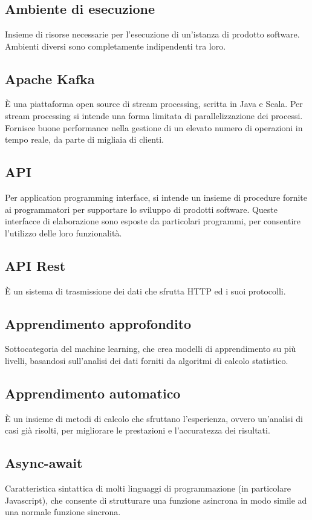   \section[A]{}
	\subsection*{Ambiente di esecuzione}
	Insieme di risorse necessarie per l'esecuzione di un'istanza di prodotto software. Ambienti diversi sono completamente indipendenti tra loro.
	\subsection*{Apache Kafka}
	È una piattaforma open source di stream processing, scritta in Java e Scala. Per stream processing si intende una forma limitata di parallelizzazione dei processi. Fornisce buone performance nella gestione di un elevato numero di operazioni in tempo reale, da parte di migliaia di clienti.
	\subsection*{API}
	Per application programming interface, si intende un insieme di procedure fornite ai programmatori per supportare lo sviluppo di prodotti software. Queste interfacce di elaborazione sono esposte da particolari programmi, per consentire l’utilizzo delle loro funzionalità.
	\subsection*{API Rest}
	È un sistema di trasmissione dei dati che sfrutta HTTP ed i suoi protocolli.
	\subsection*{Apprendimento approfondito}
	Sottocategoria del machine learning, che crea modelli di apprendimento su più livelli, basandosi sull’analisi dei dati forniti da algoritmi di calcolo statistico.
	\subsection*{Apprendimento automatico}
	È un insieme di metodi di calcolo che sfruttano l’esperienza, ovvero un’analisi di casi già risolti, per migliorare le prestazioni e l’accuratezza dei risultati.
	\subsection*{Async-await}
	Caratteristica sintattica di molti linguaggi di programmazione (in particolare Javascript), che consente di strutturare una funzione asincrona in modo simile ad una normale funzione sincrona.
